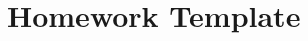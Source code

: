 \documentclass[paper=a4, fontsize=11pt]{scrartcl} %
\author{
    \textbf{YOUR NAME} \\ 
    \textbf{YOUR GIT USERNAME} \\ 
    \textbf{YOUR E-MAIL}
}%
\begin{document}
\maketitle %

\section{Homework Template}
\end{document}

